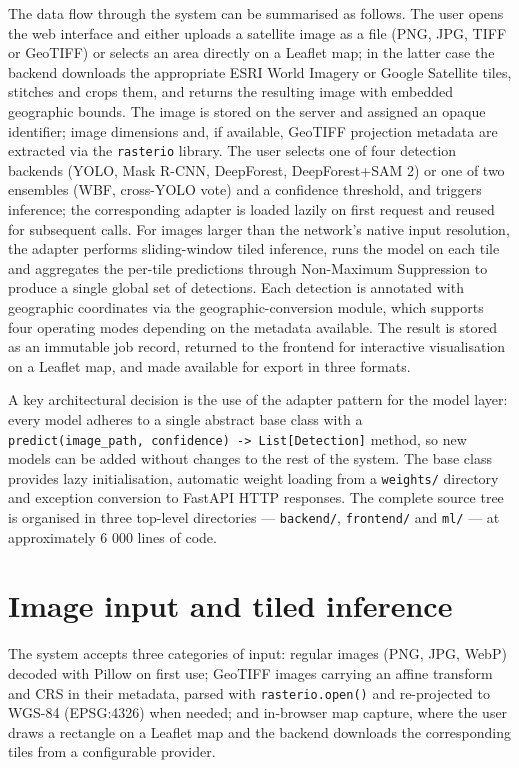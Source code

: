 The data flow through the system can be summarised as follows. The user opens the web interface and either uploads a satellite image as a file (PNG, JPG, TIFF or GeoTIFF) or selects an area directly on a Leaflet map; in the latter case the backend downloads the appropriate ESRI World Imagery or Google Satellite tiles, stitches and crops them, and returns the resulting image with embedded geographic bounds. The image is stored on the server and assigned an opaque identifier; image dimensions and, if available, GeoTIFF projection metadata are extracted via the \texttt{rasterio} library. The user selects one of four detection backends (YOLO, Mask R-CNN, DeepForest, DeepForest+SAM 2) or one of two ensembles (WBF, cross-YOLO vote) and a confidence threshold, and triggers inference; the corresponding adapter is loaded lazily on first request and reused for subsequent calls. For images larger than the network's native input resolution, the adapter performs sliding-window tiled inference, runs the model on each tile and aggregates the per-tile predictions through Non-Maximum Suppression to produce a single global set of detections. Each detection is annotated with geographic coordinates via the geographic-conversion module, which supports four operating modes depending on the metadata available. The result is stored as an immutable job record, returned to the frontend for interactive visualisation on a Leaflet map, and made available for export in three formats.

A key architectural decision is the use of the adapter pattern for the model layer: every model adheres to a single abstract base class with a \texttt{predict(image\_path,\ confidence)\ -\textgreater{}\ List{[}Detection{]}} method, so new models can be added without changes to the rest of the system. The base class provides lazy initialisation, automatic weight loading from a \texttt{weights/} directory and exception conversion to FastAPI HTTP responses. The complete source tree is organised in three top-level directories --- \texttt{backend/}, \texttt{frontend/} and \texttt{ml/} --- at approximately 6 000 lines of code.

\section{Image input and tiled inference}\label{image-input-and-tiled-inference}

The system accepts three categories of input: regular images (PNG, JPG, WebP) decoded with Pillow on first use; GeoTIFF images carrying an affine transform and CRS in their metadata, parsed with \texttt{rasterio.open()} and re-projected to WGS-84 (EPSG:4326) when needed; and in-browser map capture, where the user draws a rectangle on a Leaflet map and the backend downloads the corresponding tiles from a configurable provider.

